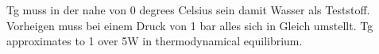 Tg muss in der nahe von 0 degrees Celsius sein damit Wasser als Teststoff. Vorheigen muss bei einem Druck von 1 bar alles sich in Gleich umstellt. Tg approximates to 1 over 5W in thermodynamical equilibrium.